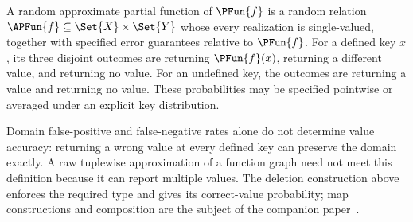 \documentclass[ ../main.tex]{subfiles}
\begin{document}
\begin{definition}
\label{def:approx_pfun}
A random approximate partial function of $\PFun{f}$ is a random relation
$\APFun{f}\subseteq\Set{X}\times\Set{Y}$ whose every realization is
single-valued, together with specified error guarantees relative to
$\PFun{f}$. For a defined key $x$, its three disjoint outcomes are returning
$\PFun{f}(x)$, returning a different value, and returning no value. For an
undefined key, the outcomes are returning a value and returning no value.
These probabilities may be specified pointwise or averaged under an explicit
key distribution.
\end{definition}

Domain false-positive and false-negative rates alone do not determine value
accuracy: returning a wrong value at every defined key can preserve the domain
exactly. A raw tuplewise approximation of a function graph need not meet this
definition because it can report multiple values. The deletion construction
above enforces the required type and gives its correct-value probability;
map constructions and composition are the subject of the companion
paper~\cite{bernoulliMaps}.
\end{document}
